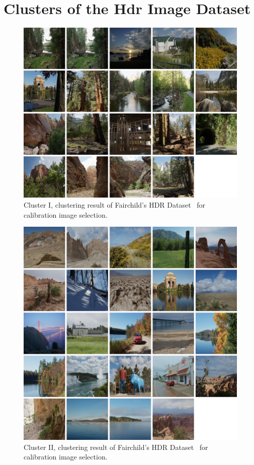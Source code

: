 \chapter{Clusters of the Hdr Image Dataset}
\label{app:clusters}

\begin{figure}[h!]
\begin{center}
\includegraphics[width=\textwidth]{appendix1/cluster1.png}
\caption{Cluster I, clustering result of Fairchild's HDR Dataset~\cite{fairchild2007hdr} for calibration image selection.}
\end{center}
\end{figure}

\begin{figure}
\begin{center}
\includegraphics[width=\textwidth]{appendix1/cluster2.png}
\caption{Cluster II, clustering result of Fairchild's HDR Dataset~\cite{fairchild2007hdr} for calibration image selection.}
\end{center}
\end{figure}

